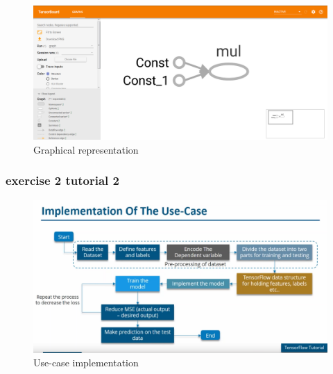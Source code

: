 \documentclass[11pt]{article}
\begin{document}
\begin{figure}[h]
\centering
\captionsetup{justification=centering}
\includegraphics[width=1\linewidth]{graph_tensor_board.pdf}
\caption{Graphical representation }
\end{figure}
\clearpage
\subsubsection{ exercise 2 tutorial 2}
\begin{figure}[h]
\centering
\captionsetup{justification=centering}
\includegraphics[width=1\linewidth]{usecase.pdf}
\caption{Use-case implementation}
\end{figure}
\end{document}
